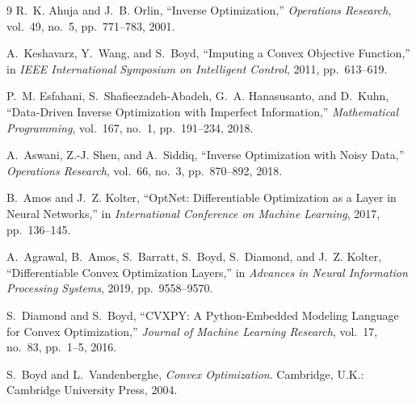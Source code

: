 \documentclass[10pt,letterpaper]{article}
\begin{document}

\begin{thebibliography}{9}
R.~K. Ahuja and J.~B. Orlin, ``Inverse Optimization,''
\emph{Operations Research}, vol.~49, no.~5, pp.~771--783, 2001.

A.~Keshavarz, Y.~Wang, and S.~Boyd, ``Imputing a Convex Objective
Function,'' in \emph{IEEE International Symposium on Intelligent
Control}, 2011, pp.~613--619.

P.~M. Esfahani, S.~Shafieezadeh-Abadeh, G.~A. Hanasusanto, and
D.~Kuhn, ``Data-Driven Inverse Optimization with Imperfect
Information,'' \emph{Mathematical Programming}, vol.~167, no.~1,
pp.~191--234, 2018.

A.~Aswani, Z.-J. Shen, and A.~Siddiq, ``Inverse Optimization with
Noisy Data,'' \emph{Operations Research}, vol.~66, no.~3,
pp.~870--892, 2018.

B.~Amos and J.~Z. Kolter, ``OptNet: Differentiable Optimization as a
Layer in Neural Networks,'' in \emph{International Conference on
Machine Learning}, 2017, pp.~136--145.

A.~Agrawal, B.~Amos, S.~Barratt, S.~Boyd, S.~Diamond, and J.~Z.
Kolter, ``Differentiable Convex Optimization Layers,'' in
\emph{Advances in Neural Information Processing Systems}, 2019,
pp.~9558--9570.

S.~Diamond and S.~Boyd, ``CVXPY: A Python-Embedded Modeling Language
for Convex Optimization,'' \emph{Journal of Machine Learning
Research}, vol.~17, no.~83, pp.~1--5, 2016.

S.~Boyd and L.~Vandenberghe, \emph{Convex Optimization}.
Cambridge, U.K.: Cambridge University Press, 2004.
\end{thebibliography}
\end{document}

